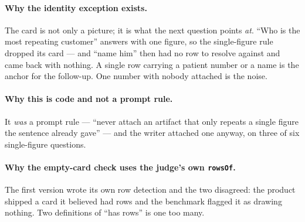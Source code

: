 \documentclass[11pt,a4paper]{report}
\newcommand{\code}[1]{\texttt{\small #1}}
\newenvironment{fitpic}
  {\par\medskip\begin{center}\begin{lrbox}{\fitbox}}
  {\end{lrbox}%
   \ifdim\wd\fitbox>\textwidth \resizebox{\textwidth}{!}{\usebox{\fitbox}}%
   \else \usebox{\fitbox}\fi
   \end{center}\medskip}
\begin{document}
\begin{fitpic}
\end{fitpic}

\paragraph{Why the identity exception exists.} The card is not only a picture; it is what the next
question points \emph{at}. ``Who is the most repeating customer'' answers with one figure, so the
single-figure rule dropped its card --- and ``name him'' then had no row to resolve against and came
back with nothing. A single row carrying a patient number or a name is the anchor for the follow-up.
One number with nobody attached is the noise.

\paragraph{Why this is code and not a prompt rule.} It \emph{was} a prompt rule --- ``never attach
an artifact that only repeats a single figure the sentence already gave'' --- and the writer
attached one anyway, on three of six single-figure questions.

\paragraph{Why the empty-card check uses the judge's own \code{rowsOf}.} The first version wrote its
own row detection and the two disagreed: the product shipped a card it believed had rows and the
benchmark flagged it as drawing nothing. Two definitions of ``has rows'' is one too many.
\end{document}
